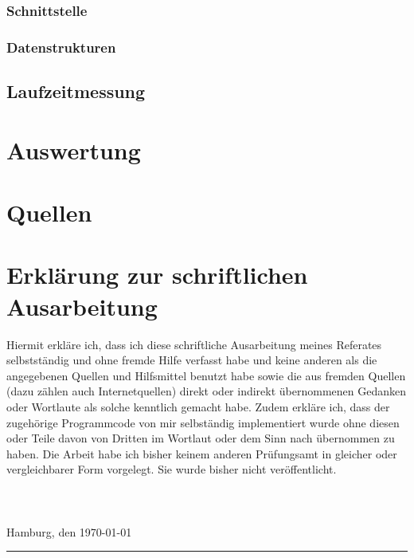 \documentclass[11pt]{article}
\begin{document}
\subsubsection{Schnittstelle}
\subsubsection{Datenstrukturen}

\subsection{Laufzeitmessung}

\section{Auswertung}

\section{Quellen}


\newpage

\section{Erkl\"arung zur schriftlichen Ausarbeitung}

Hiermit erkl\"are ich, dass ich diese schriftliche Ausarbeitung meines Referates selbstst\"andig und ohne fremde Hilfe verfasst habe und keine anderen als die angegebenen Quellen und Hilfsmittel benutzt habe sowie die aus fremden Quellen (dazu z\"ahlen auch Internetquellen) direkt oder indirekt \"ubernommenen Gedanken oder Wortlaute als solche kenntlich gemacht habe. Zudem erkl\"are ich, dass der zugeh\"orige Programmcode von mir selbst\"andig implementiert wurde ohne diesen oder Teile davon von Dritten im Wortlaut oder dem Sinn nach \"ubernommen zu haben. Die Arbeit habe ich bisher keinem anderen Pr\"ufungsamt in gleicher oder vergleichbarer Form vorgelegt. Sie wurde bisher nicht ver\"offentlicht.\\ \\ \\ \\
Hamburg, den \today \indent\rule{8.5cm}{0.4pt}
\end{document}
